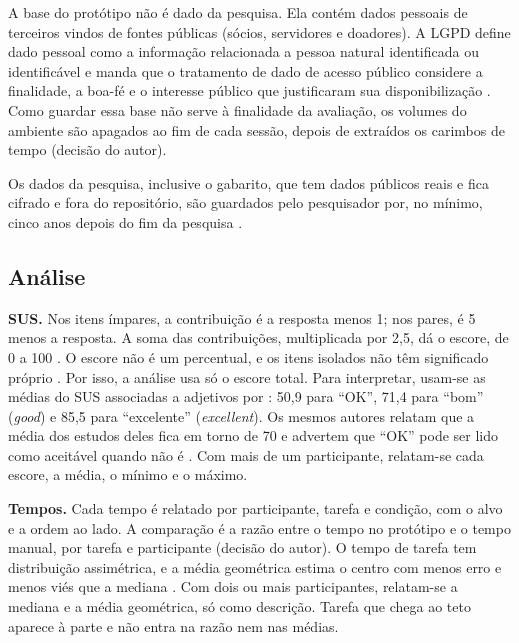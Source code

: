 A base do protótipo não é dado da pesquisa. Ela contém dados pessoais de
terceiros vindos de fontes públicas (sócios, servidores e doadores). A LGPD
define dado pessoal como a informação relacionada a pessoa natural
identificada ou identificável \cite[art.~5º, I]{brasil2018lei13709} e manda
que o tratamento de dado de acesso público considere a finalidade, a
boa-fé e o interesse público que justificaram sua disponibilização
\cite[art.~7º, § 3º]{brasil2018lei13709}. Como guardar essa base não serve à
finalidade da avaliação, os volumes do ambiente são apagados ao fim de cada
sessão, depois de extraídos os carimbos de tempo (decisão do autor).

Os dados da pesquisa, inclusive o gabarito, que tem dados públicos reais e
fica cifrado e fora do repositório, são guardados pelo pesquisador por, no
mínimo, cinco anos depois do fim da pesquisa
\cite[XI.2, f]{cns2012res466} \cite[art.~28, IV]{cns2016res510}.

\subsection{Análise}
\label{sec:avaliacao-analise}

\textbf{SUS.} Nos itens ímpares, a contribuição é a resposta menos 1; nos
pares, é 5 menos a resposta. A soma das contribuições, multiplicada por 2,5,
dá o escore, de 0 a 100 \cite{brooke2013sus}. O escore não é um percentual,
e os itens isolados não têm significado próprio \cite{brooke2013sus}. Por
isso, a análise usa só o escore total. Para interpretar, usam-se as médias
do SUS associadas a adjetivos por : 50,9 para
``OK'', 71,4 para ``bom'' (\textit{good}) e 85,5 para ``excelente''
(\textit{excellent}). Os mesmos autores relatam que a média dos estudos
deles fica em torno de 70 e advertem que ``OK'' pode ser lido como aceitável
quando não é \cite{bangor2009sus}. Com mais de um participante, relatam-se
cada escore, a média, o mínimo e o máximo.

\textbf{Tempos.} Cada tempo é relatado por participante, tarefa e condição,
com o alvo e a ordem ao lado. A comparação é a razão entre o tempo no
protótipo e o tempo manual, por tarefa e participante (decisão do autor).
O tempo de tarefa tem distribuição assimétrica, e a média geométrica estima
o centro com menos erro e menos viés que a mediana \cite{sauro2010tempos}.
Com dois ou mais participantes, relatam-se a mediana e a média geométrica,
só como descrição. Tarefa que chega ao teto aparece à parte e não entra na
razão nem nas médias.

